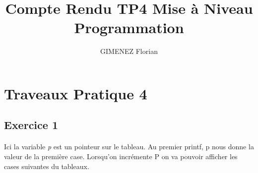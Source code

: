 \documentclass[10pt,a4paper]{article}
\author{GIMENEZ Florian}
\title{Compte Rendu TP4 Mise à Niveau Programmation}
\begin{document}
\normalem

\section{Traveaux Pratique 4}

\subsection{Exercice 1}
\paragraph{}
    Ici la variable \emph{p} est un pointeur sur le tableau. Au premier printf, p nous donne la valeur de la première case.
    Lorsqu'on incrémente P on va pouvoir afficher les cases suivantes du tableaux.
\end{document}
